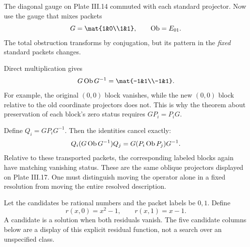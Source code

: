 
The diagonal gauge on Plate III.14 commuted with each standard projector. Now use the gauge that mixes packets
\[
G=\mat{1&0\\1&1},\qquad \Ob=E_{01}.
\]
The total obstruction transforms by conjugation, but its pattern in the \emph{fixed} standard packets changes.


Direct multiplication gives
\[
G\Ob G^{-1}=\mat{-1&1\\-1&1}.
\]
For example, the original $(0,0)$ block vanishes, while the new $(0,0)$ block relative to the old coordinate projectors does not. This is why the theorem about preservation of each block's zero status requires $G P_i=P_iG$.

Define $Q_i=GP_iG^{-1}$. Then the identities cancel exactly:
\[
Q_i(G\operatorname{Ob} G^{-1})Q_j=G(P_i\operatorname{Ob} P_j)G^{-1}.
\]
Relative to these transported packets, the corresponding labeled blocks again have matching vanishing status. These are the same oblique projectors displayed on Plate III.17. One must distinguish moving the operator alone in a fixed resolution from moving the entire resolved description.


Let the candidates be rational numbers and the packet labels be $0,1$. Define
\[
r(x,0)=x^2-1,\qquad r(x,1)=x-1.
\]
A candidate is a solution when both residuals vanish. The five candidate columns below are a display of this explicit residual function, not a search over an unspecified class.


